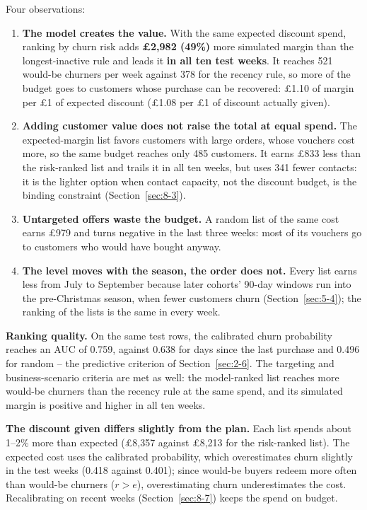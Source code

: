 Four observations:
\begin{enumerate}
    \item \textbf{The model creates the value.} With the same expected discount spend, ranking by churn risk adds \textbf{\pounds2,982 (49\%)} more simulated margin than the longest-inactive rule and leads it \textbf{in all ten test weeks}. It reaches 521 would-be churners per week against 378 for the recency rule, so more of the budget goes to customers whose purchase can be recovered: \pounds1.10 of margin per \pounds1 of expected discount (\pounds1.08 per \pounds1 of discount actually given).
    \item \textbf{Adding customer value does not raise the total at equal spend.} The expected-margin list favors customers with large orders, whose vouchers cost more, so the same budget reaches only 485 customers. It earns \pounds833 less than the risk-ranked list and trails it in all ten weeks, but uses 341 fewer contacts: it is the lighter option when contact capacity, not the discount budget, is the binding constraint (Section~\ref{sec:8-3}).
    \item \textbf{Untargeted offers waste the budget.} A random list of the same cost earns \pounds979 and turns negative in the last three weeks: most of its vouchers go to customers who would have bought anyway.
    \item \textbf{The level moves with the season, the order does not.} Every list earns less from July to September because later cohorts' 90-day windows run into the pre-Christmas season, when fewer customers churn (Section~\ref{sec:5-4}); the ranking of the lists is the same in every week.
\end{enumerate}

\textbf{Ranking quality.} On the same test rows, the calibrated churn probability reaches an AUC of 0.759, against 0.638 for days since the last purchase and 0.496 for random -- the predictive criterion of Section~\ref{sec:2-6}. The targeting and business-scenario criteria are met as well: the model-ranked list reaches more would-be churners than the recency rule at the same spend, and its simulated margin is positive and higher in all ten weeks.

\textbf{The discount given differs slightly from the plan.} Each list spends about 1--2\% more than expected (\pounds8,357 against \pounds8,213 for the risk-ranked list). The expected cost uses the calibrated probability, which overestimates churn slightly in the test weeks (0.418 against 0.401); since would-be buyers redeem more often than would-be churners ($r > e$), overestimating churn underestimates the cost. Recalibrating on recent weeks (Section~\ref{sec:8-7}) keeps the spend on budget.

